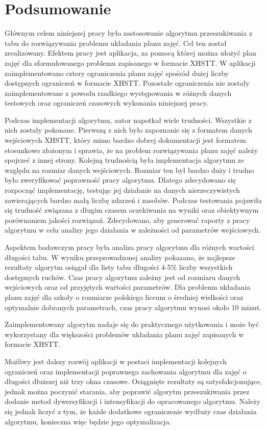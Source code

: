\chapter{Podsumowanie}

Głównym celem niniejszej pracy było zastosowanie algorytmu przeszukiwania z tabu do rozwiązywania problemu układania planu zajęć. Cel ten został zrealizowany. Efektem pracy jest aplikacja, za pomocą której można ułożyć plan zajęć dla sformułowanego problemu zapisanego w formacie XHSTT. W aplikacji zaimplementowano cztery ograniczenia planu zajęć spośród dużej liczby dostępnych ograniczeń w formacie XHSTT. Pozostałe ograniczenia nie zostały zaimplementowane z powodu rzadkiego występowania w różnych danych testowych oraz ograniczeń czasowych wykonania niniejszej pracy. 

Podczas implementacji algorytmu, autor napotkał wiele trudności. Wszystkie z nich zostały pokonane. Pierwszą z nich było zapoznanie się z formatem danych wejściowych XHSTT, który mimo bardzo dobrej dokumentacji jest formatem stosunkowo złożonym i sprawia, że na problem rozwiązywania planu zajęć należy spojrzeć z innej strony. Kolejną trudnością była implementacja algorytmu ze względu na rozmiar danych wejściowych. Rozmiar ten był bardzo duży i trudno było zweryfikować poprawność pracy algorytmu. Dlatego zdecydowano się rozpocząć implementację, testując jej działanie na danych nierzeczywistych zawierających bardzo małą liczbę zdarzeń i zasobów. Podczas testowania pojawiła się trudność związana z długim czasem oczekiwania na wyniki oraz obiektywnym porównaniem jakości rozwiązań. Zdecydowano, aby generować raporty z pracy algorytmu w celu analizy jego działania w zależności od parametrów wejściowych.

Aspektem badawczym pracy była analiza pracy algorytmu dla różnych wartości długości tabu. W wyniku przeprowadzonej analizy pokazano, że najlepsze rezultaty algorytm osiągał dla listy tabu długości 4-5\% liczby wszystkich dostępnych ruchów. Czas pracy algorytmu zależny jest od rozmiaru danych wejściowych oraz od przyjętych wartości parametrów. Dla problemu układania planu zajęć dla szkoły o rozmiarze polskiego liceum o średniej wielkości oraz optymalnie dobranych parametrach, czas pracy algorytmu wynosi około 10 minut.

Zaimplementowany algorytm nadaje się do praktycznego użytkowania i może być wykorzystany dla większości problemów układania planu zajęć zapisanych w formacie XHSTT.

Możliwy jest dalszy rozwój aplikacji w postaci implementacji kolejnych ograniczeń oraz implementacji poprawnego zachowania algorytmu dla zajęć o długości dłuższej niż trzy okna czasowe. Osiągnięte rezultaty są satysfakcjonujące, jednak można poczynić starania, aby poprawić algorytm przeszukiwania przez dodanie metod dywersyfikacji i intensyfikacji do opracowanego algorytmu. Należy się jednak liczyć z tym, że każde dodatkowe ograniczenie wydłuży czas działania algorytmu, konieczna więc będzie jego optymalizacja.
